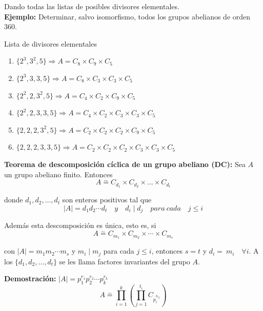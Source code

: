 \documentclass{article}
\begin{document}
Dando todas las listas de posibles divisores elementales. \\

\textbf{Ejemplo:} Determinar, salvo isomorfismo, todos los grupos abelianos de orden 360.

Lista de divisores elementales
\begin{enumerate}[(1)]
\item $\{2^3,3^2,5\}\Rightarrow A=C_8\times C_9\times C_5$
\label{ejemplo 1}

\item $\{2^3,3,3,5\}\Rightarrow A=C_8\times C_3\times C_3\times C_5$
\label{ejemplo 2}

\item $\{2^2,2,3^2,5\}\Rightarrow A=C_4\times C_2\times C_9\times C_5$
\label{ejemplo 3}

\item $\{2^2,2,3,3,5\}\Rightarrow A=C_4\times C_2\times C_3\times C_3\times C_5$
\label{ejemplo 4}

\item $\{2,2,2,3^2,5\}\Rightarrow A=C_2\times C_2\times C_2\times C_9\times C_5$
\label{ejemplo 5}

\item $\{2,2,2,3,3,5\}\Rightarrow A=C_2\times C_2\times C_2\times C_3\times C_3\times C_5$ \label{ejemplo 6}
\end{enumerate}

\textbf{Teorema de descomposición cíclica de un grupo abeliano (DC):} Sea $A$ un grupo abeliano finito. Entonces
\begin{equation*}
A\overset{\sim}{=} C_{d_1}\times C_{d_2}\times\ldots \times C_{d_t}
\end{equation*}

donde $d_1,d_2,\ldots,d_t$ son enteros positivos tal que
\begin{equation*}
|A|=d_1d_2\cdots d_t\quad y \quad d_i\mid d_j\quad para\:cada\quad j\leq i
\end{equation*}

Además esta descomposición es única, esto es, si
\begin{equation*}
A\overset{\sim}{=}C_{m_1}\times C_{m_2}\times \cdots \times C_{m_s}
\end{equation*}

con $|A|=m_1m_2\cdots m_s$ y $m_i\mid m_j$ para cada $j\leq i$, entonces $s=t$ y $d_i=~m_i\quad \forall i$. A los $\{d_1,d_2,\ldots,d_t\}$ se les llama factores invariantes del grupo $A$.

\textbf{Demostración:} $|A|=p_1^{r_1}p_2^{r_2}\cdots p_k^{r_k}$
\begin{equation*}
A\overset{\sim}{=}\prod_{i=1}^k\left(\prod_{j=1}^{t_i} C_{p_i^{n_{ij}}}\right)
\end{equation*}
\end{document}
